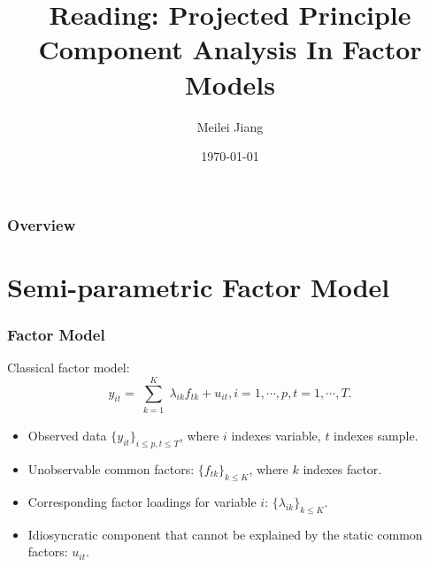 \documentclass{beamer}
\title[Projected PCA]{Reading: Projected Principle Component Analysis In Factor Models} %
\author{Meilei Jiang} %
\institute[UNC] %
{
Department of Statistics and Operations Research \\ %
\medskip
University of North Carolina at Chapel Hill %
}
\date{\today} %
\begin{document}
\begin{frame}
\titlepage %
\end{frame}

\begin{frame}
\frametitle{Overview} %
\tableofcontents %
\end{frame}


\section{Semi-parametric Factor Model} %


\begin{frame}
\frametitle{Factor Model}
Classical factor model:
\begin{equation}
	\label{eq:factormodel1}
	y_{it} = \sum_{\substack{k=1}}^{K} \lambda_{ik} f_{tk} + u_{it}, i = 1, \cdots, p, t = 1, \cdots, T.
\end{equation}
\begin{itemize}
	\item Observed data $\{y_{it}\}_{i \leq p, t \leq T}$, where $i$ indexes variable, $t$ indexes sample.
	\item Unobservable common factors: $\{f_{tk}\}_{k \leq K}$, where $k$ indexes factor.
	\item Corresponding factor loadings for variable $i$: $\{\lambda_{ik}\}_{k \leq K}$.
	\item Idiosyncratic component that cannot be explained by the static common factors: $u_{it}$.
\end{itemize}	

\end{frame}
\end{document}
